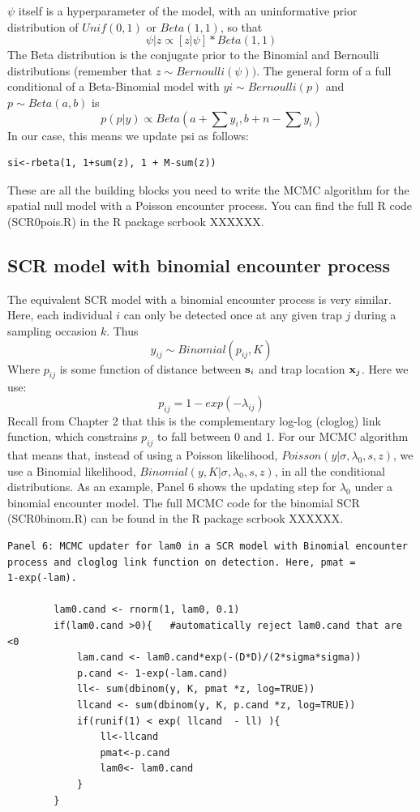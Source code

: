 $\psi$
itself is a hyperparameter of the model, with an uninformative prior distribution of $Unif(0,1)$ or $Beta(1,1)$, so that
\[
\psi|z \propto [z|\psi] * Beta(1,1)
\]
The Beta distribution is the conjugate prior to the Binomial and Bernoulli distributions (remember that $z \sim Bernoulli(\psi))$. The general form of a full conditional of a Beta-Binomial model with $yi \sim Bernoulli (p) $ and $p \sim Beta(a,b) $ is
\[
p(p|y) \propto Beta(a + \sum y_i, b + n-\sum y_i)
\]
In our case, this means we update psi as follows:
\begin{verbatim}
si<-rbeta(1, 1+sum(z), 1 + M-sum(z))
\end{verbatim}

These are all the building blocks you need to write the MCMC algorithm
for the spatial null model with a Poisson encounter process.  You can
find the full R code (SCR0pois.R) in the R package scrbook XXXXXX.

\subsection{SCR model with binomial encounter process}
The equivalent SCR model with a binomial encounter process is very similar. Here, each individual $i$ can only be detected once at any given trap $j$ during a sampling occasion $k$.
Thus
\[
y_{ij} \sim Binomial (p_{ij}, K)
\]
Where $p_{ij}$ is some function of distance between ${\bf s}_{i}$ and trap location ${\bf x}_{j}$. Here we use:
\[
p_{ij}=1-exp(-\lambda_{ij})
\]
Recall from Chapter 2 that this is the complementary log-log (cloglog) link function, which constrains $p_{ij}$ to fall between 0 and 1.
For our MCMC algorithm that means that, instead of using a Poisson likelihood, $Poisson(y|\sigma,\lambda_0,s,z)$, we use a Binomial likelihood, $Binomial(y,K|\sigma,\lambda_0,s,z)$, in all the conditional distributions. As an example, Panel 6 shows the updating step for $\lambda_0$ under a binomial encounter model. The full MCMC code for the binomial SCR (SCR0binom.R) can be found in the R package scrbook XXXXXX.

{\small
\begin{verbatim}
Panel 6: MCMC updater for lam0 in a SCR model with Binomial encounter
process and cloglog link function on detection. Here, pmat =
1-exp(-lam).

        lam0.cand <- rnorm(1, lam0, 0.1)
        if(lam0.cand >0){   #automatically reject lam0.cand that are <0
            lam.cand <- lam0.cand*exp(-(D*D)/(2*sigma*sigma))
            p.cand <- 1-exp(-lam.cand)
            ll<- sum(dbinom(y, K, pmat *z, log=TRUE))
            llcand <- sum(dbinom(y, K, p.cand *z, log=TRUE))
            if(runif(1) < exp( llcand  - ll) ){
                ll<-llcand
                pmat<-p.cand
                lam0<- lam0.cand
            }
        }
\end{verbatim}
}

